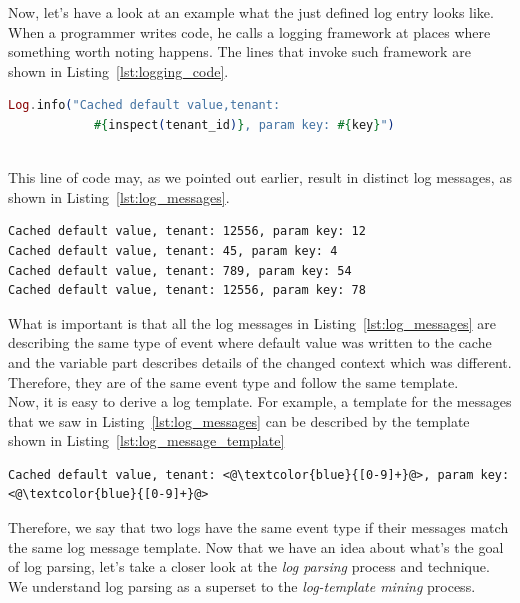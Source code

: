 Now, let's have a look at an example what the just defined log entry looks like.
When a programmer writes code, he calls a logging framework at places where something worth noting happens. The lines that invoke such framework are shown in Listing~\ref{lst:logging_code}.\\

\begin{lstlisting}[language=elixir, caption={Example of how logging is done in source code}, captionpos=b, label={lst:logging_code}]
Log.info("Cached default value,tenant: 
            #{inspect(tenant_id)}, param key: #{key}")
\end{lstlisting}
\\

This line of code may, as we pointed out earlier, result in distinct log messages, as shown in Listing~\ref{lst:log_messages}.\\

\begin{lstlisting}[label={lst:log_messages}, caption={Possible outputs of the code in Listing~\ref{lst:logging_code}}, captionpos=b]
Cached default value, tenant: 12556, param key: 12
Cached default value, tenant: 45, param key: 4
Cached default value, tenant: 789, param key: 54
Cached default value, tenant: 12556, param key: 78
\end{lstlisting}

What is important is that all the log messages in Listing~\ref{lst:log_messages} are describing the same type of event where default value was written to the cache and the variable part describes details of the changed context which was different. Therefore, they are of the same event type and follow the same template. \\

Now, it is easy to derive a log template. For example, a template for the messages that we saw in Listing~\ref{lst:log_messages} can be described by the template shown in Listing~\ref{lst:log_message_template}\\

\begin{lstlisting}[label={lst:log_message_template}, caption={Template for log messages in Listing ~\ref{lst:log_messages}, regular expressions are denoted in blue.}, captionpos=b]
Cached default value, tenant: <@\textcolor{blue}{[0-9]+}@>, param key: <@\textcolor{blue}{[0-9]+}@> 
\end{lstlisting}

Therefore, we say that two logs have the same event type if their messages match the same log message template. Now that we have an idea about what's the goal of log parsing, let's take a closer look at the \textit{log parsing} process and technique. We understand log parsing as a superset to the \textit{log-template mining} process. \\

